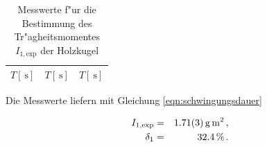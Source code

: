 				\begin{table}[h!]
					\begin{center}
						\label{tabelle:kugel}
						\caption{Messwerte f"ur die Bestimmung des Tr"agheitsmomentes $I_\mathrm{1, exp}$ der Holzkugel}
						\begin{tabular}{|c||c||c|}
							\hline
							$T [\SI{}{\second}]$ & $T [\SI{}{\second}]$ & $T [\SI{}{\second}]$ \\
							\hline 
							\hline
							
							\hline 
						\end{tabular}
					\end{center}
				\end{table}

				Die Messwerte liefern mit Gleichung \eqref{eqn:schwingungsdauer}

				\begin{eqnarray*}
					I_\mathrm{1, exp} & = & \SI{1.71 (3)}{\gram \meter \squared} \,, \\
					\delta_1 & = & \SI{32.4}{\percent} \,.
				\end{eqnarray*}

			\clearpage
